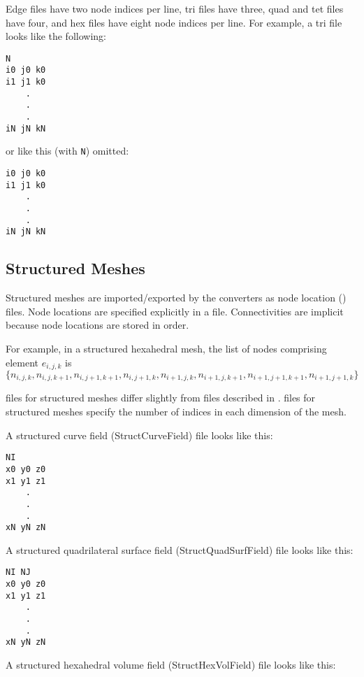Edge files have two node indices per line, tri files have three, quad
and tet files have four, and hex files have eight node indices per
line.  For example, a tri file looks like the following:

\begin{verbatim}
N
i0 j0 k0
i1 j1 k0
    .
    .
    .
iN jN kN
\end{verbatim}

or like this (with \verb|N|) omitted:

\begin{verbatim}
i0 j0 k0
i1 j1 k0
    .
    .
    .
iN jN kN
\end{verbatim}

\subsection{Structured Meshes}

Structured meshes are imported/exported by the converters as node
location () files.  Node locations are specified explicitly in a
 file. Connectivities are implicit because node locations are
stored in  order.

For example, in a structured hexahedral mesh, the list of nodes comprising
element \(e_{i,j,k}\) is \(\{n_{i,j,k}, n_{i,j,k+1}, n_{i,j+1,k+1}, n_{i,j+1,k}, n_{i+1,j,k}, n_{i+1,j,k+1}, n_{i+1,j+1,k+1}, n_{i+1,j+1,k}\}\)

 files for structured meshes differ slightly
from  files described in .   files for
structured meshes specify the number of indices in each dimension of the
mesh. 

A structured curve field (StructCurveField)  file looks
like this:

\begin{verbatim}
NI
x0 y0 z0
x1 y1 z1
    .
    .
    .
xN yN zN
\end{verbatim}

A structured quadrilateral surface field
(StructQuadSurfField)  file looks like this:

\begin{verbatim}
NI NJ
x0 y0 z0
x1 y1 z1
    .
    .
    .
xN yN zN
\end{verbatim}

A structured hexahedral volume field (StructHexVolField)
 file looks like this:

